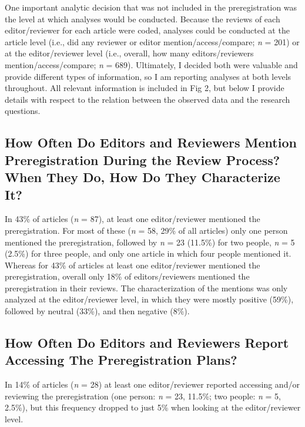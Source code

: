 \documentclass[authordate, meta, issue]{jote-new-article}
\begin{document}
	One important analytic decision that was not included in the preregistration was the level at which analyses would be conducted. Because the reviews of each editor/reviewer for each article were coded, analyses could be conducted at the article level (i.e., did any reviewer or editor mention/access/compare; \emph{n} = 201) or at the editor/reviewer level (i.e., overall, how many editors/reviewers mention/access/compare; \emph{n} = 689). Ultimately, I decided both were valuable and provide different types of information, so I am reporting analyses at both levels throughout. All relevant information is included in Fig 2, but below I provide details with respect to the relation between the observed data and the research questions.



	\subsection{How Often Do Editors and Reviewers Mention Preregistration During the Review Process? When They Do, How Do They Characterize It?}



	In 43\% of articles (\emph{n} = 87), at least one editor/reviewer mentioned the preregistration. For most of these (\emph{n} = 58, 29\% of all articles) only one person mentioned the preregistration, followed by \emph{n} = 23 (11.5\%) for two people, \emph{n} = 5 (2.5\%) for three people, and only one article in which four people mentioned it. Whereas for 43\% of articles at least one editor/reviewer mentioned the preregistration, overall only 18\% of editors/reviewers mentioned the preregistration in their reviews. The characterization of the mentions was only analyzed at the editor/reviewer level, in which they were mostly positive (59\%), followed by neutral (33\%), and then negative (8\%).

	

	\subsection{How Often Do Editors and Reviewers Report Accessing The Preregistration Plans?}



	In 14\% of articles (\emph{n} = 28) at least one editor/reviewer reported accessing and/or reviewing the preregistration (one person: \emph{n} = 23, 11.5\%; two people: \emph{n} = 5, 2.5\%), but this frequency dropped to just 5\% when looking at the editor/reviewer level.
\end{document}

